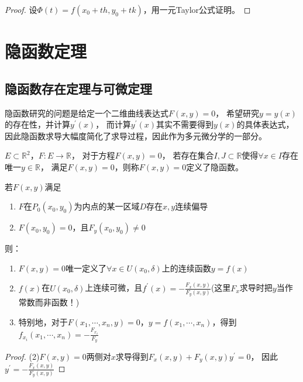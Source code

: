 \begin{proof}
  设$\Phi(t) = f(x_0 + th, y_0 + tk)$，用一元Taylor公式证明。
\end{proof}

\section{隐函数定理}

\subsection{隐函数存在定理与可微定理}

隐函数研究的问题是给定一个二维曲线表达式$F(x,y) = 0$，
希望研究$y = y(x)$的存在性，并计算$y^{\prime}(x)$，
而计算$y^{\prime}(x)$其实不需要得到$y(x)$的具体表达式，
因此隐函数求导大幅度简化了求导过程，因此作为多元微分学的一部分。

\begin{definition}[隐函数]
  $E \subset \mathbb{R}^2$，$F: E \rightarrow \mathbb{R}$，
  对于方程$F(x,y) = 0$，
  若存在集合$I,J \subset \mathbb{R}$使得$\forall x \in I$存在唯一$y \in \mathbb{R}$，
  满足$F(x,y) = 0$，则称$F(x,y) = 0$定义了隐函数。
\end{definition}

\begin{theorem}[隐函数存在唯一性定理]
  若$F(x,y)$满足
  \begin{enumerate}
  \item 
    $F$在$P_0(x_0,y_0)$为内点的某一区域$D$存在$x,y$连续偏导
  \item 
    $F(x_0,y_0) = 0$，且$F_y(x_0,y_0) \neq 0$
  \end{enumerate}
  则：
  \begin{enumerate}
  \item $F(x,y) = 0$唯一定义了$\forall x \in U(x_0, \delta)$上的连续函数$y = f(x)$
  \item $f(x)$在$U(x_0,\delta)$上连续可微，且$f^{\prime}(x) = - \frac{F_x(x,y)}{F_y(x,y)}$(这里$F_x$求导时把$y$当作常数而非函数！)
  \item 特别地，对于$F(x_1,\cdots,x_n,y) = 0$，$y = f(x_1,\cdots,x_n)$，得到$f_{x_i}(x_1,\cdots,x_n) = - \frac{F_{x_i}}{F_y}$
  \end{enumerate}
\end{theorem}

\begin{proof}
  (2)$F(x,y) = 0$两侧对$x$求导得到$F_x(x,y) + F_y(x,y)y^{\prime} = 0$，
  因此$y^{\prime} = - \frac{F_x(x,y)}{F_y(x,y)}$
\end{proof}


